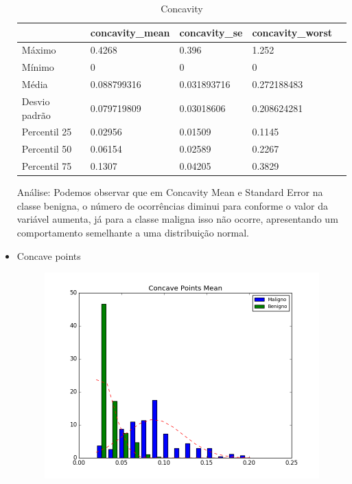 \documentclass[11pt,a4paper]{article}
\numberwithin{equation}{section}
\begin{document}
\begin{itemize}
\begin{table}[H]
\centering
\caption{Concavity}
\label{my-label}
\begin{tabular}{lllll} \hline
              & concavity\_mean & concavity\_se & concavity\_worst &  \\ \hline
Máximo        & 0.4268          & 0.396         & 1.252            &  \\
Mínimo        & 0               & 0             & 0                &  \\
Média         & 0.088799316     & 0.031893716   & 0.272188483      &  \\
Desvio padrão & 0.079719809     & 0.03018606    & 0.208624281      &  \\
Percentil 25  & 0.02956         & 0.01509       & 0.1145           &  \\
Percentil 50  & 0.06154         & 0.02589       & 0.2267           &  \\
Percentil 75  & 0.1307          & 0.04205       & 0.3829           & \\ \hline
\end{tabular}
\end{table}

Análise: Podemos observar que em Concavity Mean e Standard Error na classe benigna, o número de ocorrências diminui para conforme o valor da variável aumenta, já para a classe maligna isso não ocorre, apresentando um comportamento semelhante a uma distribuição normal. 

\item Concave points
\begin{figure}[H]
\centering
  \includegraphics[width=.5\linewidth]{../img/hist/concave_points_mean}
  \label{fig:test1}
\end{figure}%


\end{itemize}
\end{document}

